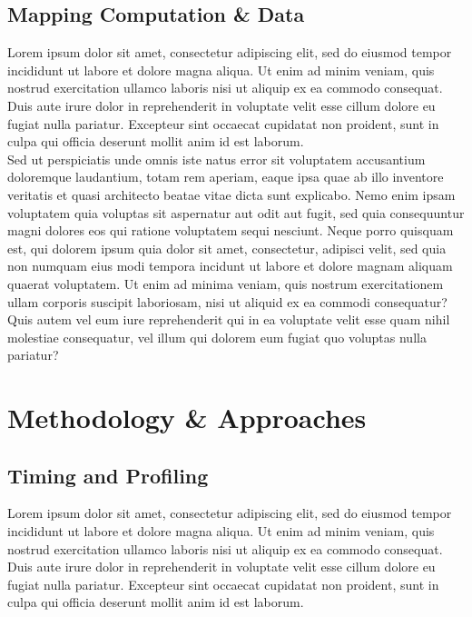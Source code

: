 \documentclass[a4paper,12pt]{article}
\theoremstyle{mytheor}
\begin{document}
        \subsection{Mapping Computation \& Data}
                Lorem ipsum dolor sit amet, consectetur adipiscing elit, sed do eiusmod tempor incididunt ut labore et dolore magna aliqua. Ut enim ad minim veniam, quis nostrud exercitation ullamco laboris nisi ut aliquip ex ea commodo consequat. Duis aute irure dolor in reprehenderit in voluptate velit esse cillum dolore eu fugiat nulla pariatur. Excepteur sint occaecat cupidatat non proident, sunt in culpa qui officia deserunt mollit anim id est laborum.\\
                
                \noindent Sed ut perspiciatis unde omnis iste natus error sit voluptatem accusantium doloremque laudantium, totam rem aperiam, eaque ipsa quae ab illo inventore veritatis et quasi architecto beatae vitae dicta sunt explicabo. Nemo enim ipsam voluptatem quia voluptas sit aspernatur aut odit aut fugit, sed quia consequuntur magni dolores eos qui ratione voluptatem sequi nesciunt. Neque porro quisquam est, qui dolorem ipsum quia dolor sit amet, consectetur, adipisci velit, sed quia non numquam eius modi tempora incidunt ut labore et dolore magnam aliquam quaerat voluptatem. Ut enim ad minima veniam, quis nostrum exercitationem ullam corporis suscipit laboriosam, nisi ut aliquid ex ea commodi consequatur? Quis autem vel eum iure reprehenderit qui in ea voluptate velit esse quam nihil molestiae consequatur, vel illum qui dolorem eum fugiat quo voluptas nulla pariatur?
    \section{Methodology \& Approaches}
        \subsection{Timing and Profiling}
            Lorem ipsum dolor sit amet, consectetur adipiscing elit, sed do eiusmod tempor incididunt ut labore et dolore magna aliqua. Ut enim ad minim veniam, quis nostrud exercitation ullamco laboris nisi ut aliquip ex ea commodo consequat. Duis aute irure dolor in reprehenderit in voluptate velit esse cillum dolore eu fugiat nulla pariatur. Excepteur sint occaecat cupidatat non proident, sunt in culpa qui officia deserunt mollit anim id est laborum.\\
                
\end{document}
